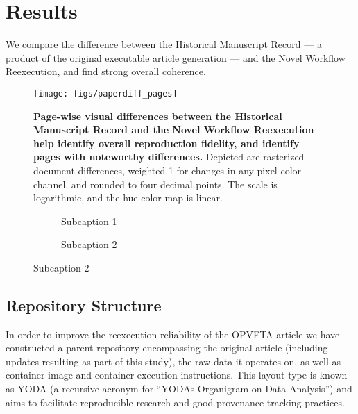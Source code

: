 \section{Results}
We compare the difference between the Historical Manuscript Record — a product of the original executable article generation — and the Novel Workflow Reexecution, and find strong overall coherence.

\begin{figure}
	\centering
	\texttt{[image: figs/paperdiff\_pages]}
	\caption{
		\textbf{Page-wise visual differences between the Historical Manuscript Record and the Novel Workflow Reexecution help identify overall reproduction fidelity, and identify pages with noteworthy differences.}
		Depicted are rasterized document differences, weighted 1 for changes in any pixel color channel, and rounded to four decimal points.
		The scale is logarithmic, and the hue color map is linear.
	}
	\label{fig:paperdiff_pages}
\end{figure}

\begin{figure}
	\centering
	\begin{subfigure}
		\texttt{[image: figs/diff\_date]}
		\caption{
			Subcaption 1
		}
		\label{fig:diff_date}
	\end{subfigure}
	\begin{subfigure}
		\texttt{[image: figs/diff\_text]}
		\caption{
			Subcaption 2
		}
		\label{fig:diff_text}
	\end{subfigure}
\end{figure}


\subsection{Repository Structure}
In order to improve the reexecution reliability of the OPVFTA article we have constructed a parent repository encompassing the original article (including updates resulting as part of this study), the raw data it operates on, as well as container image and container execution instructions.
This layout type is known as YODA (a recursive acronym for “YODAs Organigram on Data Analysis”) and aims to facilitate reproducible research and good provenance tracking practices.

